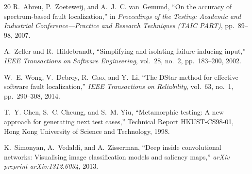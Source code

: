 \documentclass[sigconf,nonacm]{acmart}
\begin{document}
\begin{thebibliography}{20}
R.~Abreu, P.~Zoeteweij, and A.~J.~C. van~Gemund,
``On the accuracy of spectrum-based fault localization,''
in \emph{Proceedings of the Testing: Academic and Industrial Conference---Practice and Research Techniques (TAIC PART)}, pp.~89--98, 2007.

A.~Zeller and R.~Hildebrandt,
``Simplifying and isolating failure-inducing input,''
\emph{IEEE Transactions on Software Engineering}, vol.~28, no.~2, pp.~183--200, 2002.

W.~E. Wong, V.~Debroy, R.~Gao, and Y.~Li,
``The {DStar} method for effective software fault localization,''
\emph{IEEE Transactions on Reliability}, vol.~63, no.~1, pp.~290--308, 2014.

T.~Y. Chen, S.~C. Cheung, and S.~M. Yiu,
``Metamorphic testing: A new approach for generating next test cases,''
Technical Report HKUST-CS98-01, Hong Kong University of Science and Technology, 1998.

K.~Simonyan, A.~Vedaldi, and A.~Zisserman,
``Deep inside convolutional networks: Visualising image classification models and saliency maps,''
\emph{arXiv preprint arXiv:1312.6034}, 2013.

\end{thebibliography}
\end{document}
